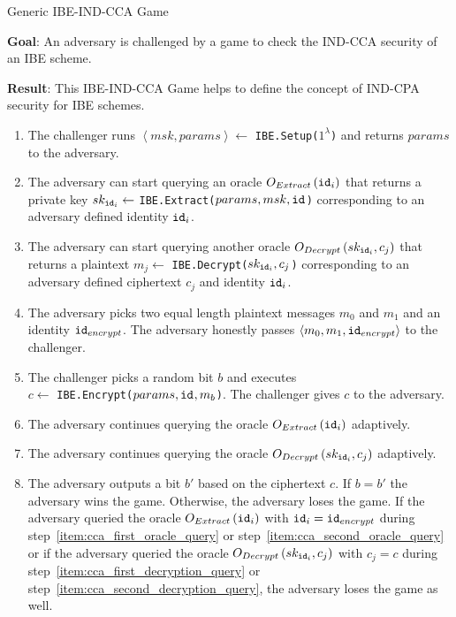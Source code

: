 \begin{game}
\caption{Generic IBE-IND-CCA Game~\cite{thesis:Alfredo08}}
\label{game:ind_cca_game}
\begin{description}
 \item \textbf{Goal}: An adversary is challenged by a game to check the IND-CCA security of an IBE scheme.
 
 \item \textbf{Result}: This IBE-IND-CCA Game helps to define the concept of IND-CPA security for IBE schemes.
\end{description}

 \begin{enumerate}
  \item The challenger runs $\left< msk, params\right> \leftarrow$ \texttt{IBE.Setup($1^{\lambda}$)} and returns $params$ to the adversary.
  \item \label{item:cca_first_oracle_query} The adversary can start querying an oracle $O_{Extract} \left( \mathtt{id}_{i} \right)$ that returns a private key $sk_{\mathtt{id}_{i}} \leftarrow$ \texttt{IBE.Extract($params, msk, \mathtt{id}_{}$)} corresponding to an adversary defined identity $\mathtt{id}_{i}$.
  \item \label{item:cca_first_decryption_query} The adversary can start querying another oracle $O_{Decrypt} \left( sk_{\mathtt{id}_{i}}, c_j \right)$ that returns a plaintext $m_j \leftarrow$ \texttt{IBE.Decrypt($sk_{\mathtt{id}_{i}}, c_j$)} corresponding to an adversary defined ciphertext $c_j$ and identity $\mathtt{id}_{i}$.
  \item The adversary picks two equal length plaintext messages $m_0$ and $m_1$ and an identity $\mathtt{id}_{encrypt}$. The adversary honestly passes $\left< m_0, m_1, \mathtt{id}_{encrypt} \right>$ to the challenger.
  \item The challenger picks a random bit $b$ and executes \\ $c \leftarrow$ \texttt{IBE.Encrypt($params, \mathtt{id}_{}, m_b$)}. The challenger gives $c$ to the adversary.
  \item \label{item:cca_second_oracle_query} The adversary continues querying the oracle $O_{Extract} \left( \mathtt{id}_{i} \right)$ adaptively.
  \item \label{item:cca_second_decryption_query} The adversary continues querying the oracle $O_{Decrypt} \left( sk_{\mathtt{id}_{i}}, c_j \right)$ adaptively.
  \item The adversary outputs a bit $b'$ based on the ciphertext $c$. If $b = b'$ the adversary wins the game. Otherwise, the adversary loses the game. If the adversary queried the oracle $O_{Extract} \left( \mathtt{id}_{i} \right)$ with $\mathtt{id}_{i} = \mathtt{id}_{encrypt}$ during step~\ref{item:cca_first_oracle_query} or step~\ref{item:cca_second_oracle_query} or if the adversary queried the oracle $O_{Decrypt} \left( sk_{\mathtt{id}_{i}}, c_j \right)$ with $c_j = c$ during step~\ref{item:cca_first_decryption_query} or step~\ref{item:cca_second_decryption_query}, the adversary loses the game as well.
 \end{enumerate}
\end{game}


